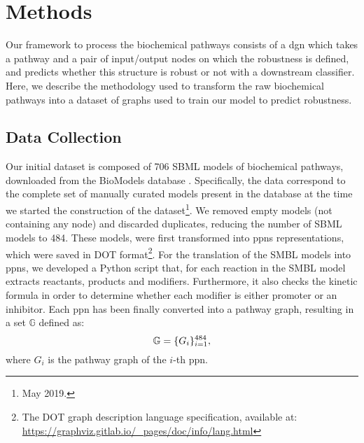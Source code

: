 \section{Methods}
Our framework to process the biochemical pathways consists of a \gls{dgn} which takes a pathway and a pair of input/output nodes on which the robustness is defined, and predicts whether this structure is robust or not with a downstream classifier. Here, we describe the methodology used to transform the raw biochemical pathways into a dataset of graphs used to train our model to predict robustness.

\subsection{Data Collection}\label{subsec:data-collection}
Our initial dataset is composed of 706 SBML models of biochemical pathways, downloaded from the BioModels database \cite{?}. Specifically, the data correspond to the complete set of manually curated models present in the database at the time we started the construction of the dataset\footnote{May 2019.}. We removed empty models (not containing any node) and discarded duplicates, reducing the number of SBML models to 484. These models, were first transformed into \glspl{ppn} representations, which were saved in DOT format\footnote{The DOT graph description language specification, available at: \url{https://graphviz.gitlab.io/_pages/doc/info/lang.html}}. For the translation of the SMBL models into \glspl{ppn}, we developed a Python script that, for each reaction in the SMBL model extracts reactants, products and modifiers. Furthermore, it also checks the kinetic formula in order to determine whether each modifier is either promoter or an inhibitor. Each \gls{ppn} has been finally converted into a pathway graph, resulting in a set $\mathbb{G}$ defined as: $$\mathbb{G} = \{ G_{i} \}_{i=1}^{484},$$
where $G_i$ is the pathway graph of the $i$-th \gls{ppn}.

